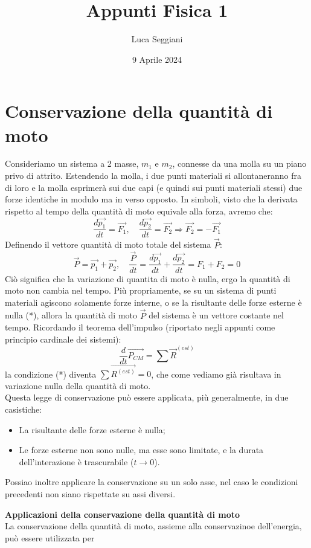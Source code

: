 \documentclass[a4paper,12pt]{article}
\title{Appunti Fisica 1}
\author{Luca Seggiani}
\date{9 Aprile 2024}
\begin{document}
\maketitle
\section{Conservazione della quantità di moto}
Consideriamo un sistema a 2 masse, $m_1$ e $m_2$, connesse da una molla su un piano privo di attrito.
Estendendo la molla, i due punti materiali si allontaneranno fra di loro e la molla esprimerà sui due capi (e quindi
sui punti materiali stessi) due forze identiche in modulo ma in verso opposto. In simboli, visto che la derivata rispetto
al tempo della quantità di moto equivale alla forza, avremo che:
$$ \frac{d\vec{p_1}}{dt} = \vec{F_1}, \quad \frac{d\vec{p_2}}{dt} = \vec{F_2} \Rightarrow \vec{F_2} = -\vec{F_1} $$
Definendo il vettore quantità di moto totale del sistema $\vec{P}$:
$$ \vec{P} = \vec{p_1} + \vec{p_2}, \quad \frac{\vec{P}}{dt} = \frac{d\vec{p_1}}{dt} + \frac{d\vec{p_2}}{dt} = F_1 + F_2 = 0 $$
Ciò significa che la variazione di quantita di moto è nulla, ergo la quantità di moto non cambia nel tempo. Più
propriamente, se su un sistema di punti materiali agiscono solamente forze interne, o se la risultante delle forze esterne è
nulla (*), allora la quantità di moto $\vec{P}$ del sistema è un vettore costante nel tempo. Ricordando il teorema dell'impulso
(riportato negli appunti come principio cardinale dei sistemi):
$$ \frac{d}{dt}\vec{P_{CM}} = \sum \vec{R}^{(est)} $$
la condizione (*) diventa $\sum \vec{R^{(est)}} = 0$, che come vediamo già risultava in variazione nulla della quantità
di moto. \\
Questa legge di conservazione può essere applicata, più generalmente, in due casistiche:
\begin{itemize}
  \item La risultante delle forze esterne è nulla;
  \item Le forze esterne non sono nulle, ma esse sono limitate, e la durata dell'interazione è trascurabile
    ($t \rightarrow 0$).
\end{itemize}
Possiao inoltre applicare la conservazione su un solo asse, nel caso le condizioni precedenti non siano rispettate
su assi diversi. \\
\par\smallskip
\textbf{Applicazioni della conservazione della quantità di moto} \\
La conservazione della quantità di moto, assieme alla conservazinoe dell'energia, può essere utilizzata per
\end{document}
